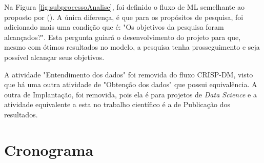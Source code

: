Na Figura \ref{fig:subprocessoAnalise}, foi definido o fluxo de ML semelhante ao proposto por \citeauthor{BRINK2015} (\citeyear{BRINK2015}). A única diferença, é que para os propósitos de pesquisa, foi adicionado mais uma condição que é: "Os objetivos da pesquisa foram alcançados?". Esta pergunta guiará o desenvolvimento do projeto para que, mesmo com ótimos resultados no modelo, a pesquisa tenha prosseguimento e seja possível alcançar seus objetivos.

A atividade "Entendimento dos dados" foi removida do fluxo CRISP-DM, visto que há uma outra atividade de "Obtenção dos dados" que possui equivalência. A outra de Implantação, foi removida, pois ela é para projetos de \textit{Data Science} e a atividade equivalente a esta no trabalho científico é a de Publicação dos resultados.

\section{Cronograma}

